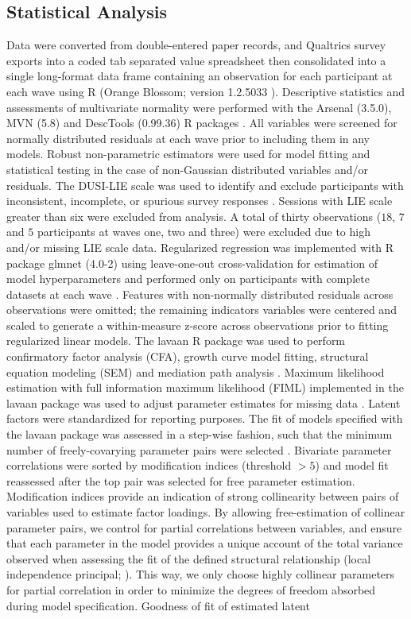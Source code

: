 \documentclass[utf8]{article}
\begin{document}
\subsection*{Statistical Analysis}
Data were converted from double-entered paper records, and Qualtrics survey exports into a coded tab separated value spreadsheet then consolidated into a single long-format data frame containing an observation for each participant at each wave using R (Orange Blossom; version 1.2.5033 \cite{R}). Descriptive statistics and assessments of multivariate normality were performed with the Arsenal (3.5.0), MVN (5.8) and DescTools (0.99.36) R packages \citep{MVN,DescTools}. All variables were screened for normally distributed residuals at each wave prior to including them in any models. Robust non-parametric estimators were used for model fitting and statistical testing in the case of non-Gaussian distributed variables and/or residuals. The DUSI-LIE scale was used to identify and exclude participants with inconsistent, incomplete, or spurious survey responses \citep{dalla2003effects}. Sessions with LIE scale greater than six were excluded from analysis. A total of thirty observations ($18$, $7$ and $5$ participants at waves one, two and three) were excluded due to high and/or missing LIE scale data. Regularized regression was implemented with R package glmnet (4.0-2) using leave-one-out cross-validation for estimation of model hyperparameters and performed only on participants with complete datasets at each wave \citep{friedman2009glmnet, FriedmanHastieTibshirani2010}. Features with non-normally distributed residuals across observations were omitted; the remaining indicators variables were centered and scaled to generate a within-measure z-score across observations prior to fitting regularized linear models. The lavaan R package was used to perform confirmatory factor analysis (CFA), growth curve model fitting, structural equation modeling (SEM) and mediation path analysis \citep{Lavaan}. Maximum likelihood estimation with full information maximum likelihood (FIML) implemented in the lavaan package was used to adjust parameter estimates for missing data \citep{cham2017full}. Latent factors were standardized for reporting purposes. The fit of models specified with the lavaan package was assessed in a step-wise fashion, such that the minimum number of freely-covarying parameter pairs were selected \citep{schreiber2006reporting}. Bivariate parameter correlations were sorted by modification indices (threshold $>5$) and model fit reassessed after the top pair was selected for free parameter estimation. Modification indices provide an indication of strong collinearity between pairs of variables used to estimate factor loadings. By allowing free-estimation of collinear parameter pairs, we control for partial correlations between variables, and ensure that each parameter in the model provides a unique account of the total variance observed when assessing the fit of the defined structural relationship (local independence principal; \cite{sobel1997measurement}). This way, we only choose highly collinear parameters for partial correlation in order to minimize the degrees of freedom absorbed during model specification. Goodness of fit of estimated latent 
\end{document}
